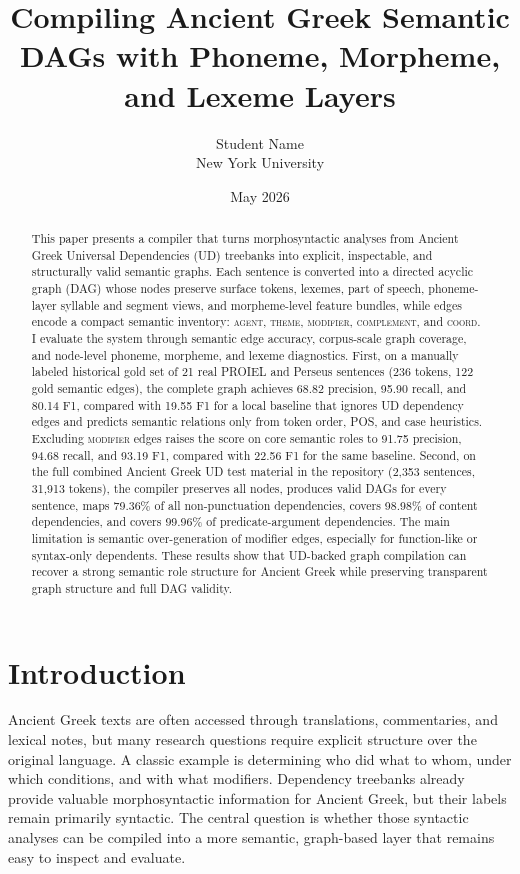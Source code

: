 \documentclass[11pt]{article}
\title{Compiling Ancient Greek Semantic DAGs with Phoneme, Morpheme, and Lexeme Layers}
\author{Student Name \\ New York University}
\date{May 2026}
\begin{document}
\maketitle

\begin{abstract}
This paper presents a compiler that turns morphosyntactic analyses from Ancient
Greek Universal Dependencies (UD) treebanks into explicit, inspectable, and
structurally valid semantic graphs. Each sentence is converted into a directed
acyclic graph (DAG) whose nodes preserve surface tokens, lexemes, part of speech,
phoneme-layer syllable and segment views, and morpheme-level feature bundles,
while edges encode a compact semantic
inventory: \textsc{agent}, \textsc{theme}, \textsc{modifier},
\textsc{complement}, and \textsc{coord}. I evaluate the system through semantic
edge accuracy, corpus-scale graph coverage, and node-level phoneme, morpheme,
and lexeme diagnostics. First, on a manually labeled
historical gold set of 21 real PROIEL and Perseus sentences (236 tokens, 122
gold semantic edges), the complete graph achieves 68.82 precision, 95.90 recall,
and 80.14 F1, compared with 19.55 F1 for a local baseline that ignores UD
dependency edges and predicts semantic relations only from token order, POS, and
case heuristics. Excluding \textsc{modifier} edges raises the score on core
semantic roles to 91.75 precision, 94.68 recall, and 93.19 F1, compared with
22.56 F1 for the same baseline. Second, on the full combined Ancient Greek UD
test material in the repository (2,353 sentences, 31,913 tokens), the
compiler preserves all nodes, produces valid DAGs for every sentence, maps
79.36\% of all non-punctuation dependencies, covers 98.98\% of content
dependencies, and covers 99.96\% of predicate-argument dependencies. The main
limitation is semantic over-generation of modifier edges, especially for
function-like or syntax-only dependents. These results show that UD-backed
graph compilation can recover a strong semantic role structure for
Ancient Greek while preserving transparent graph structure and full DAG validity.
\end{abstract}

\section{Introduction}
Ancient Greek texts are often accessed through translations, commentaries, and
lexical notes, but many research questions require explicit structure over the
original language. A classic example is determining who did what to whom, under
which conditions, and with what modifiers. Dependency treebanks already provide
valuable morphosyntactic information for Ancient Greek, but their labels remain
primarily syntactic. The central question is whether those syntactic analyses can be
compiled into a more semantic, graph-based layer that remains easy to inspect
and evaluate.
\end{document}
